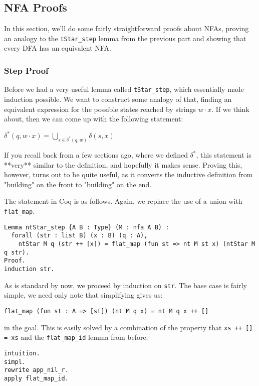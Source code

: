\subsection{NFA Proofs}

In this section, we'll do some fairly straightforward proofs about NFAs, proving an analogy to the \texttt{tStar_step} lemma from the previous part and showing that every DFA has an equivalent NFA.

\subsubsection{Step Proof}

Before we had a very useful lemma called \texttt{tStar_step}, which essentially made induction possible.
We want to construct some analogy of that, finding an equivalent expression for the possible states reached by strings $w \cdot x$.
If we think about, then we can come up with the following statement:

$ \delta^*(q, w \cdot x) = \displaystyle\bigcup_{s \in \delta^*(q, w)} \delta(s, x) $

If you recall back from a few sections ago, where we defined $\delta^*$, this statement is **very** similar to the definition, and hopefully it makes sense.
Proving this, however, turns out to be quite useful, as it converts the inductive definition from "building" on the front to "building" on the end.

The statement in Coq is as follows.
Again, we replace the use of a union with \texttt{flat_map}.

\begin{verbatim}
Lemma ntStar_step {A B : Type} (M : nfa A B) :
  forall (str : list B) (x : B) (q : A),
    ntStar M q (str ++ [x]) = flat_map (fun st => nt M st x) (ntStar M q str).
Proof.
induction str.
\end{verbatim}

As is standard by now, we proceed by induction on \texttt{str}.
The base case is fairly simple, we need only note that simplifying gives us:
\begin{verbatim}
flat_map (fun st : A => [st]) (nt M q x) = nt M q x ++ []
\end{verbatim}

in the goal.
This is easily solved by a combination of the property that \texttt{xs ++ [] = xs} and the \texttt{flat_map_id} lemma from before.

\begin{verbatim}
intuition.
simpl.
rewrite app_nil_r.
apply flat_map_id.
\end{verbatim}

